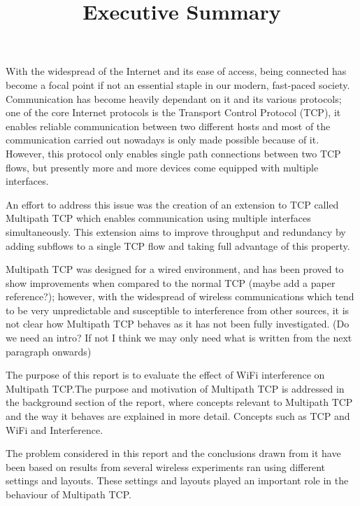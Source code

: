 \documentclass[12pt,a4paper]{article}
\title{Executive Summary}
\date{\vspace{-8ex}}
\begin{document}
\doublespacing
\maketitle
With the widespread of the Internet and its ease of access, being connected has
become a focal point if not an essential staple in our modern, fast-paced
society. Communication has become heavily dependant on it and its various
protocols; one of the core Internet protocols is the Transport Control Protocol
(TCP), it enables reliable communication between two different hosts and most of
the communication carried out nowadays is only made possible because of it.
However, this protocol only enables single path connections between two TCP
flows, but presently more and more devices come equipped with multiple
interfaces.

An effort to address this issue was the creation of an extension to TCP called
Multipath TCP which enables communication using multiple interfaces
simultaneously. This extension aims to improve throughput and redundancy by
adding subflows to a single TCP flow and taking full advantage of this property.

Multipath TCP was designed for a wired environment, and has been proved to show
improvements when compared to the normal TCP (maybe add a paper reference?);
however, with the widespread of wireless communications which tend to be very
unpredictable and susceptible to interference from other sources, it is not
clear how Multipath TCP behaves as it has not been fully investigated. (Do we
need an intro? If not I think we may only need what is written from the next
paragraph onwards)

The purpose of this report is to evaluate the effect of WiFi interference on
Multipath TCP.\@ The purpose and motivation of Multipath TCP is addressed in the
background section of the report, where concepts relevant to Multipath TCP and
the way it behaves are explained in more detail. Concepts such as TCP and WiFi
and Interference.
 
The problem considered in this report and the conclusions drawn from it have
been based on results from several wireless experiments ran using different
settings and layouts. These settings and layouts played an important role in the
behaviour of Multipath TCP.
 
\end{document}
